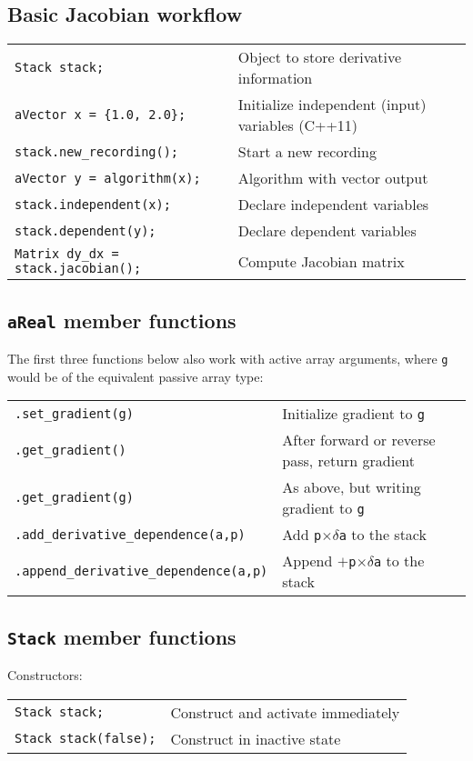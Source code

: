 \documentclass[10pt,a4,landscape]{article}
\def\code#1{\texttt{#1}}
\begin{document}
\subsection*{Basic Jacobian workflow}
\begin{tabular}{ll}
\code{Stack stack;} & Object to store derivative information\\
\code{aVector x = \{1.0, 2.0\};} & Initialize independent (input) variables (C++11)\\
\code{stack.new\_recording();} & Start a new recording\\
\code{aVector y = algorithm(x);} & Algorithm with vector output\\
\code{stack.independent(x);} & Declare independent variables \\
\code{stack.dependent(y);} & Declare dependent variables\\
\code{Matrix dy\_dx = stack.jacobian();} & Compute Jacobian matrix\\
\end{tabular}
\subsection*{\code{aReal} member functions}
The first three functions below also work with active array arguments, where
\code{g} would be of the equivalent passive array type:\\
\begin{tabular}{ll}
\code{.set\_gradient(g)} & Initialize gradient to \code{g} \\
\code{.get\_gradient()} & After forward or reverse pass, return gradient\\
\code{.get\_gradient(g)} & As above, but writing gradient to \code{g}\\
\code{.add\_derivative\_dependence(a,p)} & Add \code{p}$\times\delta$\code{a} to the stack\\
\code{.append\_derivative\_dependence(a,p)} & Append $+$\code{p}$\times\delta$\code{a} to the stack\\
\end{tabular}

\subsection*{\code{Stack} member functions}
Constructors:\\
\begin{tabular}{ll}
\code{Stack stack;} & Construct and activate immediately \\
\code{Stack stack(false);} & Construct in inactive state\\
\end{tabular}
\end{document}
